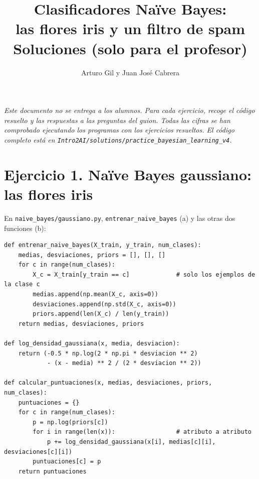 \documentclass{article}
\title{Clasificadores Naïve Bayes:\\ las flores iris y un filtro de spam\\[6pt] \large Soluciones (solo para el profesor)}
\author{Arturo Gil y Juan José Cabrera}
\date{}
\begin{document}
\maketitle

\noindent\textit{Este documento no se entrega a los alumnos. Para cada ejercicio, recoge el código resuelto y las respuestas a las preguntas del guion. Todas las cifras se han comprobado ejecutando los programas con los ejercicios resueltos. El código completo está en \texttt{Intro2AI/solutions/practice\_bayesian\_learning\_v4}.}

\section*{Ejercicio 1. Naïve Bayes gaussiano: las flores iris}
En \texttt{naive\_bayes/gaussiano.py}, \texttt{entrenar\_naive\_bayes} (a) y las otras dos funciones (b):
\begin{lstlisting}
def entrenar_naive_bayes(X_train, y_train, num_clases):
    medias, desviaciones, priors = [], [], []
    for c in range(num_clases):
        X_c = X_train[y_train == c]             # solo los ejemplos de la clase c
        medias.append(np.mean(X_c, axis=0))
        desviaciones.append(np.std(X_c, axis=0))
        priors.append(len(X_c) / len(y_train))
    return medias, desviaciones, priors

def log_densidad_gaussiana(x, media, desviacion):
    return (-0.5 * np.log(2 * np.pi * desviacion ** 2)
            - (x - media) ** 2 / (2 * desviacion ** 2))

def calcular_puntuaciones(x, medias, desviaciones, priors, num_clases):
    puntuaciones = {}
    for c in range(num_clases):
        p = np.log(priors[c])
        for i in range(len(x)):                 # atributo a atributo
            p += log_densidad_gaussiana(x[i], medias[c][i], desviaciones[c][i])
        puntuaciones[c] = p
    return puntuaciones
\end{lstlisting}
\end{document}
